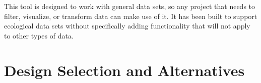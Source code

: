 \documentclass[12pt,letterpaper]{scrartcl}
\begin{document}
This tool is designed to work with general data sets, so any project that needs to filter, 
visualize, or transform data can make use of it.  It has been built to support ecological data sets 
without specifically adding functionality that will not apply to other types of data.

\setcounter{page}{1}

\pagebreak


\section{Design Selection and Alternatives}





\end{document}
